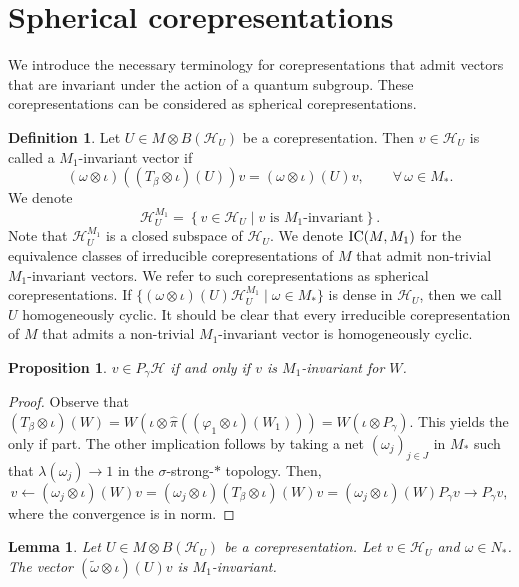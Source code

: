 \documentclass[pdftex]{sigma}
\numberwithin{equation}{section}
\newtheorem{prop}[thm]{Proposition}
\newtheorem{lem}[thm]{Lemma}
\theoremstyle{definition}
\newtheorem{dfn}[thm]{Definition}
\newcommand{\cHil}{\mathcal{H}}
\newcommand{\ICMM}{\text{\rm IC}(M, M_1)}
\begin{document}
\section{Spherical corepresentations}\label{SectSphericalCoreps}
 We introduce the necessary terminology for corepresentations that admit vectors that are invariant under the action of a quantum subgroup. These corepresentations can be considered as spherical corepresentations.


\begin{dfn}\label{DfnMOneInv}
 Let $U \in M \otimes B(\cHil_U)$ be a corepresentation. Then  $v \in \cHil_U$   is called a $M_1$-invariant vector if
\[
 (\omega \otimes \iota)((T_\beta \otimes \iota)(U)) v = (\omega \otimes \iota)(U)v, \qquad \forall\, \omega\in M_\ast.
\]
 We denote
\[
\cHil_U^{M_1} = \left\{v \in \cHil_U \mid v \textrm{ is } M_1 \textrm{-invariant} \right\}.
\]
 Note that $\cHil_U^{M_1}$ is a closed subspace of $\cHil_U$. We denote
$
\ICMM
$
 for the equivalence classes of irreducible corepresentations of $M$ that admit non-trivial $M_1$-invariant vectors. We refer to such corepresentations as spherical corepresentations. If $\{ (\omega \otimes \iota)(U) \cHil_U^{M_1} \mid \omega \in M_\ast \}$ is dense in $\cHil_U$, then we call $U$ homogeneously cyclic. It should be clear that every irreducible corepresentation of $M$ that admits a non-trivial $M_1$-invariant vector is homogeneously cyclic.
 \end{dfn}

\begin{prop}\label{PropMOneInv}
$ v \in P_\gamma \cHil$ if and only if $v$ is $M_1$-invariant for $W$.
\end{prop}
\begin{proof}
Observe that $ (T_\beta \otimes \iota)(W) = W \left(\iota \otimes \hat{\pi}((\varphi_1 \otimes \iota)(W_1))\right) = W (\iota \otimes P_\gamma)$. This yields the only if part. The other implication follows by taking a  net $(\omega_j)_{j \in J}$ in $M_\ast$ such that $\lambda(\omega_j) \rightarrow 1$ in the $\sigma$-strong-$\ast$ topology. Then,
\[
v \leftarrow (\omega_j \otimes \iota)(W) v =  (\omega_j \otimes \iota)(T_\beta \otimes \iota)(W) v = (\omega_j \otimes \iota)( W)  P_\gamma v \rightarrow P_\gamma v,
\]
where the convergence is in norm.
\end{proof}


\begin{lem}
 Let $U \in M \otimes B(\cHil_U)$ be a corepresentation. Let $v \in \cHil_U$ and $\omega \in N_\ast$. The vector $(\tilde{\omega} \otimes \iota)(U) v$ is $M_1$-invariant.
\end{lem}
\end{document}
